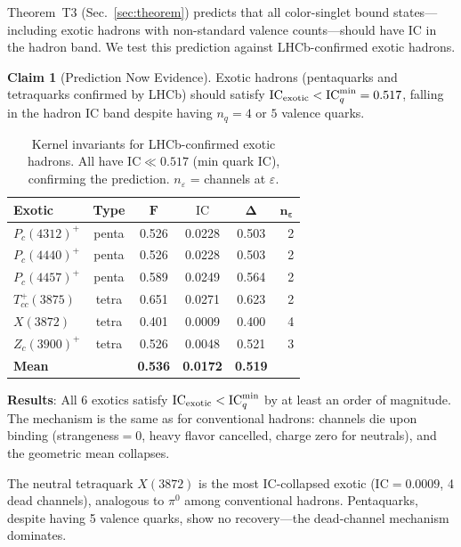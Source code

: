 \documentclass[11pt,a4paper]{article}
\theoremstyle{plain}
\theoremstyle{definition}
\newtheorem{claim}{Claim}
\theoremstyle{remark}
\newcommand{\eps}{\varepsilon}
\newcommand{\IC}{\mathrm{IC}}
\begin{document}
Theorem~T3 (Sec.~\ref{sec:theorem}) predicts that all
color-singlet bound states---including exotic hadrons with
non-standard valence counts---should have $\IC$ in the hadron
band.  We test this prediction against LHCb-confirmed exotic
hadrons.

\begin{claim}[Prediction Now Evidence]\label{claim:exotics}
Exotic hadrons (pentaquarks and tetraquarks confirmed by LHCb)
should satisfy $\IC_{\rm exotic} < \IC_q^{\min} = 0.517$,
falling in the hadron IC band despite having $n_q = 4$ or $5$
valence quarks.
\end{claim}

\begin{table}[H]
\caption{Kernel invariants for LHCb-confirmed exotic hadrons.
All have $\IC \ll 0.517$ (min quark IC), confirming the
prediction.  $n_\eps$ = channels at $\eps$.}
\label{tab:exotics}
\centering\small
\begin{tabular}{@{}lccccr@{}}
\toprule
\textbf{Exotic} & \textbf{Type} & $\bm{F}$ &
  $\bm{\IC}$ & $\bm{\Delta}$ & $\bm{n_\eps}$ \\
\midrule
$P_c(4312)^+$ & penta & 0.526 & 0.0228 & 0.503 & 2 \\
$P_c(4440)^+$ & penta & 0.526 & 0.0228 & 0.503 & 2 \\
$P_c(4457)^+$ & penta & 0.589 & 0.0249 & 0.564 & 2 \\
$T_{cc}^+(3875)$ & tetra & 0.651 & 0.0271 & 0.623 & 2 \\
$X(3872)$      & tetra & 0.401 & 0.0009 & 0.400 & 4 \\
$Z_c(3900)^+$  & tetra & 0.526 & 0.0048 & 0.521 & 3 \\
\midrule
\textbf{Mean}  & & \textbf{0.536} & \textbf{0.0172} &
  \textbf{0.519} & \\
\bottomrule
\end{tabular}
\end{table}

\textbf{Results}: All 6 exotics satisfy
$\IC_{\rm exotic} < \IC_q^{\min}$ by at least an order of
magnitude.  The mechanism is the same as for conventional hadrons:
channels die upon binding (strangeness$=0$, heavy flavor
cancelled, charge zero for neutrals), and the geometric mean
collapses.

The neutral tetraquark $X(3872)$ is the most IC-collapsed exotic
($\IC = 0.0009$, 4 dead channels), analogous to $\pi^0$ among
conventional hadrons.  Pentaquarks, despite having 5 valence
quarks, show no recovery---the dead-channel mechanism dominates.
\end{document}
